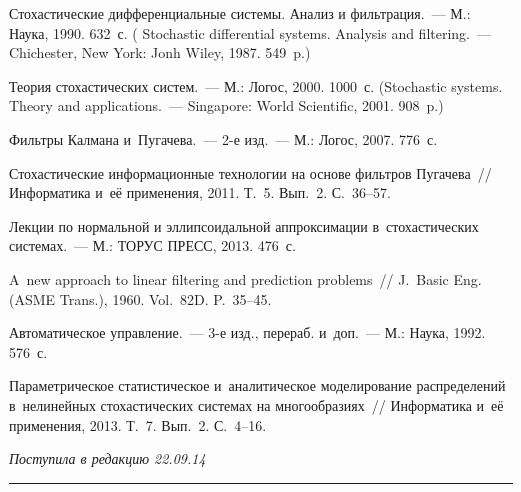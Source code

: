 \begin{multicols}{2}
{\small\frenchspacing
 {%
 \begin{thebibliography}{9}

Стохастические дифференциальные системы. Анализ и фильтрация.~---
М.: Наука,  1990. 632~с.
(
Stochastic differential systems. Analysis and filtering.~---
Chichester, New York: Jonh Wiley, 1987. 549~p.)

Теория стохастических систем.~--- М.: Логос,  2000.  1000~с.
(Stochastic systems. Theory and applications.~--- Singapore: World Scientific,
2001. 908~p.)

 Фильтры Калмана и~Пугачева.~--- 2-е изд.~---
М.: Логос, 2007. 776~с.



 Стохастические информационные технологии
на основе фильтров Пугачева~// Информатика и~её применения, 2011. Т.~5.
Вып.~2. С.~36--57.

Лекции по нормальной и эллипсоидальной аппроксимации в~стохастических системах.~---
М.: ТОРУС ПРЕСС, 2013. 476~с.

 A~new approach to linear filtering and prediction problems~//
J.~Basic Eng. (ASME Trans.), 1960. Vol.~82D. P.~35--45.

 Автоматическое управление.~---
3-е изд., перераб. и~доп.~--- М.: Наука, 1992. 576~с.

Параметрическое статистическое и~аналитическое моделирование распределений
в~нелинейных стохастических системах на многообразиях~// Информатика
и~её применения, 2013. Т.~7. Вып.~2. С.~4--16.
 \end{thebibliography}

 }
 }

\end{multicols}

\vspace*{-3pt}

\hfill{\small\textit{Поступила в редакцию 22.09.14}}


\vspace*{12pt}

\hrule

\vspace*{2pt}

